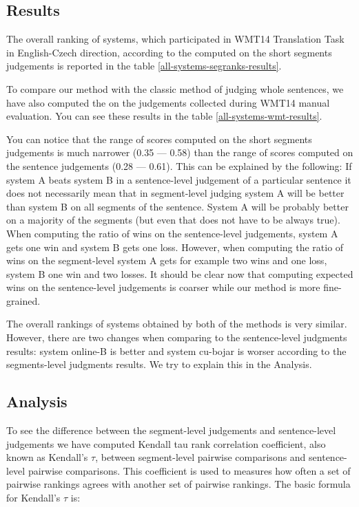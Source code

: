 \subsection{Results}

The overall ranking of systems, which participated in WMT14 Translation Task in
English-Czech direction, according to the  computed on the short segments judgements is reported in the table
\ref{all-systems-segranks-results}.

To compare our method with the classic method of judging whole sentences, we
have also computed the  on the judgements
collected during WMT14 manual evaluation. You can see these results in the
table \ref{all-systems-wmt-results}.

You can notice that the range of scores computed on the short segments
judgements is much narrower (0.35 --- 0.58) than the range of scores computed
on the sentence judgements (0.28 --- 0.61). This can be explained by the
following: If system A beats system B in a sentence-level judgement of a
particular sentence it does not necessarily mean that in segment-level judging
system A will be better than system B on all segments of the sentence. System A
will be probably better on a majority of the segments (but even that does not
have to be always true). When computing the ratio of wins on the sentence-level
judgements, system A gets one win and system B gets one loss. However, when
computing the ratio of wins on the segment-level system A gets for example two
wins and one loss, system B one win and two losses. It should be clear now that
computing expected wins on the sentence-level judgements is coarser while our
method is more fine-grained.  

The overall rankings of systems obtained by both of the methods is very
similar. However, there are two changes when comparing to the sentence-level
judgments results: system online-B is better and system cu-bojar is worser
according to the segments-level judgments results. We try to explain this in the Analysis.

\subsection{Analysis}

To see the difference between the segment-level judgements and sentence-level
judgements we have computed Kendall tau rank correlation coefficient, also
known as Kendall's $\tau$, between segment-level pairwise comparisons and
sentence-level pairwise comparisons. This coefficient is used to measures how
often a set of pairwise rankings agrees with another set of pairwise rankings.
The basic formula for Kendall's $\tau$ is:

